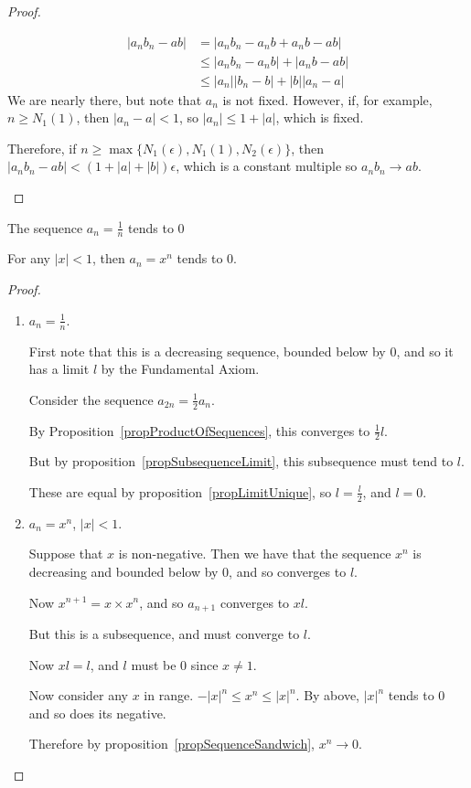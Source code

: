\documentclass[../Main.tex]{subfiles}
\begin{document}
\begin{proof}
\begin{enumerate}
\begin{align*}
                |a_n b_n - ab| &= |a_n b_n - a_n b + a_n b - ab| \\
                &\leq |a_n b_n - a_n b| + |a_n b - ab| \\
                &\leq |a_n| |b_n - b| + |b| |a_n - a|
            \end{align*}
            We are nearly there, but note that $a_n$ is not fixed. However, if, for example, $n \geq N_1(1)$, then $|a_n - a| < 1$, so $|a_n| \leq 1 + |a|$, which is fixed.\par
            Therefore, if $n \geq \max{\{N_1(\epsilon), N_1(1), N_2(\epsilon)\}}$, then $|a_n b_n - ab| < (1 + |a| + |b|)\epsilon$, which is a constant multiple so $a_n b_n \rightarrow ab$.
    \end{enumerate}
\end{proof}
\begin{propositions}{}
    \item The sequence $a_n = \frac{1}{n}$ tends to 0
    \item For any $|x| < 1$, then $a_n = x^n$ tends to 0.
\end{propositions}
\begin{proof}
    \begin{enumerate}
        \item $a_n = \frac{1}{n}$.\par
            First note that this is a decreasing sequence, bounded below by 0, and so it has a limit $l$ by the Fundamental Axiom.\par
            Consider the sequence $a_{2n} = \frac{1}{2} a_n$.\par
            By Proposition~\ref{propProductOfSequences}, this converges to $\frac{1}{2}l$.\par
            But by proposition~\ref{propSubsequenceLimit}, this subsequence must tend to $l$.\par
            These are equal by proposition~\ref{propLimitUnique}, so $l = \frac{l}{2}$, and $l = 0$.
        \item $a_n = x^n$, $|x| < 1$.\par
            Suppose that $x$ is non-negative. Then we have that the sequence $x^n$ is decreasing and bounded below by 0, and so converges to $l$.\par
            Now $x^{n+1} = x \times x^n$, and so $a_{n+1}$ converges to $x l$.\par
            But this is a subsequence, and must converge to $l$.\par
            Now $xl = l$, and $l$ must be 0 since $x \neq 1$.\par
            Now consider any $x$ in range. $-|x|^n \leq x^n \leq |x|^n$. By above, $|x|^n$ tends to 0 and so does its negative.\par
            Therefore by proposition~\ref{propSequenceSandwich}, $x^n \rightarrow 0$.
    \end{enumerate}
\end{proof}
\end{document}
